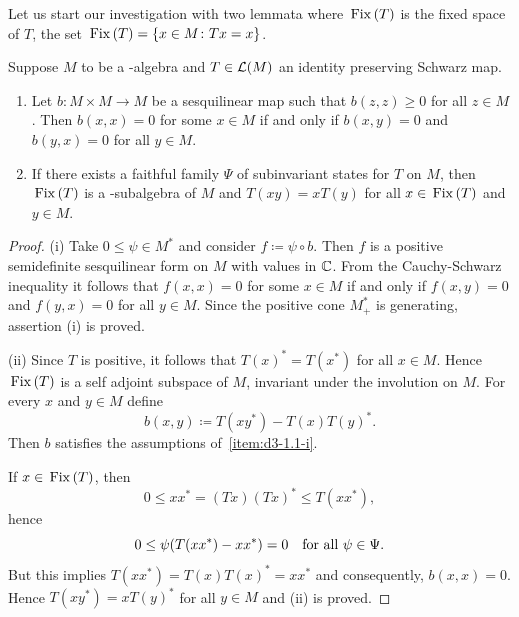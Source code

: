 Let us start our investigation with two lemmata where $ \mathop{}\mathrm{Fix}\left(T\right) $ is the fixed space of\/ $T$, \ie the set $ \mathop{}\mathrm{Fix}\left(T\right) = \{x\in M \colon Tx=x \}$.
\begin{lemma}\label{lem:d3-1.1}
Suppose $M$ to be a \CA-algebra and $ T \in \mathcal{L}(M) $ an identity preserving Schwarz map.
\begin{enumerate}[\upshape (i)]%

\item\label{item:d3-1.1-i}
Let $ b \colon M \times M \to M $ be a sesquilinear map such that $ b(z,z) \geq 0 $ for all $ z \in M $.
Then $ b(x,x) = 0 $ for some $x\in M$ if and only if\/ $b(x,y) = 0$ and $b(y,x) = 0$ for all $y\in M$.

\item\label{item:d3-1.1-ii}
If there exists a faithful family $\Psi$ of subinvariant states for $T$ on $M$, then $\mathop{}\mathrm{Fix}\left(T\right)$ is a \CA-subalgebra of\/ $M$ and $T(xy) = xT(y)$ for all $ x \in \mathop{}\mathrm{Fix}\left(T\right) $ and $ y \in M $.

\end{enumerate}
\end{lemma}
\begin{proof} 
(i) Take $0 \leq \psi \in M^{*}$ and consider $f \coloneq \psi\circ b$.
Then $f$ is a positive semidefinite sesquilinear form on $M$ with values in $\mathbb{C}$.
From the Cauchy-Schwarz inequality it follows that $f(x,x) = 0$ for some $x\in M$ if and only if\/ $f(x,y) = 0$ and $f(y,x) = 0$ for all $y\in M$.
Since the positive cone $M^{*}_{+}$ is generating, assertion (i) is proved.

(ii) Since $T$ is positive,  it follows that $T(x)^{*} = T(x^{*})$ for all $x \in M$.
Hence $\mathop{}\mathrm{Fix}\left(T\right)$ is a self adjoint subspace of\/ $M$, \ie invariant under the involution on $M$.
For every $x$ and $ y \in M $ define
\[
	b(x,y) \coloneq T(xy^{*}) - T(x)T(y)^{*}.
\]
Then $b$ satisfies the assumptions of~\ref{item:d3-1.1-i}.

If\/ $x\in\mathop{}\mathrm{Fix}\left(T\right)$, then
\[
0 \leq xx^{*} = (Tx)(Tx)^{*} \leq T(xx^{*}),
\]
hence
\[
0 \leq \psi(T(xx^{*}) - xx^{*}) = 0 \quad \text{for all $ \psi\in\Psi $.} 
\]
But this implies $T(xx^{*}) = T(x)T(x)^{*} = xx^{*}$ and consequently, $b(x,x) = 0$.
Hence $T(xy^{*}) = xT(y)^{*}$ for all $y\in M$ and (ii) is proved.
\end{proof}
